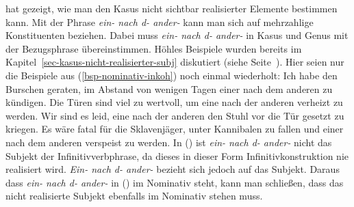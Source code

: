 \citet*[Kapitel~6]{Hoehle83a}
hat gezeigt, wie man den Kasus nicht sichtbar realisierter Elemente bestimmen kann. Mit der Phrase
{\em ein- nach d- ander-} kann 
man sich auf mehrzahlige Konstituenten beziehen. Dabei muss {\em ein- nach d- ander-}
in Kasus und Genus mit der Bezugsphrase übereinstimmen. Höhles Beispiele wurden
bereits im Kapitel~\ref{sec-kasus-nicht-realisierter-subj} diskutiert (siehe Seite~\pageref{bsp-tueren-hoehle}).
Hier seien nur die Beispiele aus (\ref{bsp-nominativ-inkoh}) noch einmal wiederholt:
\eal
\label{bsp-nominativ-inkoh-zwei}
\ex Ich habe den Burschen geraten, im Abstand von wenigen Tagen einer nach dem anderen
      zu kündigen.\label{bsp-nominativ-inkoh-geraten-zwei}
\ex Die Türen sind viel zu wertvoll, um eine nach der anderen verheizt zu werden.
\ex Wir sind es leid, eine nach der anderen den Stuhl vor die Tür gesetzt zu kriegen.
\ex Es wäre fatal für die Sklavenjäger, unter Kannibalen zu fallen und einer nach dem
      anderen verspeist zu werden.
\zl
In () ist {\em ein- nach d- ander-} nicht das Subjekt der Infinitivverbphrase,
da dieses in dieser Form Infinitivkonstruktion nie realisiert wird. {\em Ein- nach d- ander-} bezieht sich
jedoch auf das Subjekt. Daraus dass {\em ein- nach d- ander-} in () im Nominativ
steht, kann man schließen, dass das nicht realisierte Subjekt ebenfalls im Nominativ
stehen muss.

